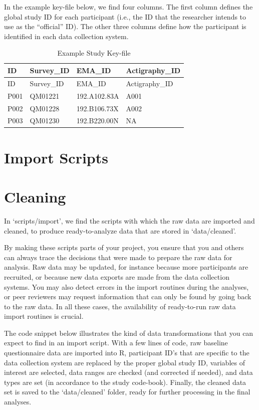 \documentclass[]{book}
\begin{document}
In the example key-file below, we find four columns. The first column
defines the global study ID for each participant (i.e., the ID that the
researcher intends to use as the ``official'' ID). The other three
columns define how the participant is identified in each data collection
system.

\begin{longtable}[]{@{}llll@{}}
\caption{\label{tab:tab5a} Example Study Key-file}\tabularnewline
\toprule
ID & Survey\_ID & EMA\_ID & Actigraphy\_ID\tabularnewline
\midrule
\endfirsthead
\toprule
ID & Survey\_ID & EMA\_ID & Actigraphy\_ID\tabularnewline
\midrule
\endhead
P001 & QM01221 & 192.A102.83A & A001\tabularnewline
P002 & QM01228 & 192.B106.73X & A002\tabularnewline
P003 & QM01230 & 192.B220.00N & NA\tabularnewline
\bottomrule
\end{longtable}

\section{Import Scripts}\label{import-scripts}

\section{Cleaning}\label{cleaning}

In `scripts/import', we find the scripts with which the raw data are
imported and cleaned, to produce ready-to-analyze data that are stored
in `data/cleaned'.

By making these scripts parts of your project, you ensure that you and
others can always trace the decisions that were made to prepare the raw
data for analysis. Raw data may be updated, for instance because more
participants are recruited, or because new data exports are made from
the data collection systems. You may also detect errors in the import
routines during the analyses, or peer reviewers may request information
that can only be found by going back to the raw data. In all these
cases, the availability of ready-to-run raw data import routines is
crucial.

The code snippet below illustrates the kind of data transformations that
you can expect to find in an import script. With a few lines of code,
raw baseline questionnaire data are imported into R, participant ID's
that are specific to the data collection system are replaced by the
proper global study ID, variables of interest are selected, data ranges
are checked (and corrected if needed), and data types are set (in
accordance to the study code-book). Finally, the cleaned data set is
saved to the `data/cleaned' folder, ready for further processing in the
final analyses.
\end{document}
